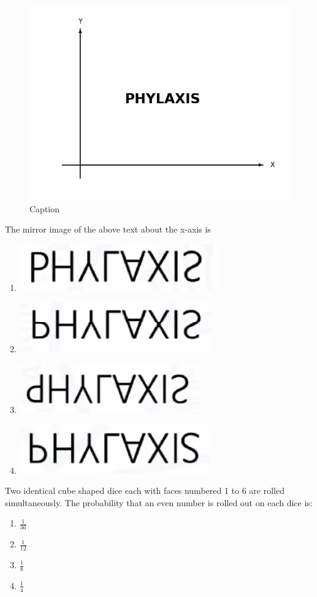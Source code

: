 \item \begin{figure}[H]
    \centering
    \includegraphics[width=0.5\linewidth]{GATE-yearwise/2021/figs/fig.png}
    \caption{Caption}
    \label{fig:enter-label}
\end{figure}
The mirror image of the above text about the x-axis is
\begin{multicols}{2}
    \begin{enumerate}
        \item \includegraphics[width = 0.5\linewidth]{GATE-yearwise/2021/figs/fig_a.jpeg}
        \item \includegraphics[width = 0.5\linewidth]{GATE-yearwise/2021/figs/fig_b.jpeg}
        \item \includegraphics[width = 0.5\linewidth]{GATE-yearwise/2021/figs/fig_c.jpeg}
        \item \includegraphics[width = 0.5\linewidth]{GATE-yearwise/2021/figs/fig_d.jpeg}
    \end{enumerate}
\end{multicols}
    
\item Two identical cube shaped dice each with faces numbered 1 to 6 are rolled simultaneously. The probability that an even number is rolled out on each dice is:
\begin{multicols}{2}
    \begin{enumerate}
        \item $\frac{1}{36}$
        \item $\frac{1}{12}$
        \item $\frac{1}{8}$
        \item $\frac{1}{4}$
    \end{enumerate}
\end{multicols}


